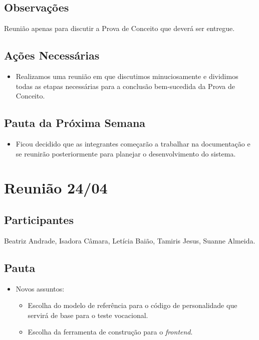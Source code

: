 \begin{apendicesenv}
\subsection*{Observações}
Reunião apenas para discutir a Prova de Conceito que deverá ser entregue.

\subsection*{Ações Necessárias}
\begin{itemize}
    \item Realizamos uma reunião em que discutimos minuciosamente e dividimos todas as etapas necessárias para a conclusão bem-sucedida da Prova de Conceito.
\end{itemize}

\subsection*{Pauta da Próxima Semana}
\begin{itemize}
    \item Ficou decidido que as integrantes começarão a trabalhar na documentação e se reunirão posteriormente para planejar o desenvolvimento do sistema.
\end{itemize}

\section*{Reunião 24/04}

\subsection*{Participantes}
Beatriz Andrade, Isadora Câmara, Letícia Baião, Tamiris Jesus, Suanne Almeida.

\subsection*{Pauta}
\begin{itemize}
    \item Novos assuntos:
    \begin{itemize}
        \item Escolha do modelo de referência para o código de personalidade que servirá de base para o teste vocacional.
        \item Escolha da ferramenta de construção para o \textit{frontend}.
    \end{itemize}
\end{itemize}


\end{apendicesenv}
